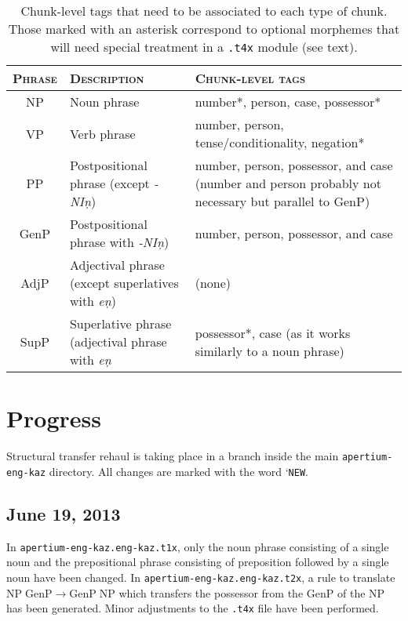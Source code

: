 \documentclass{article}
\begin{document}
\begin{table}
\begin{center}
\begin{tabular}{c|p{4cm}|p{5.6cm}}
\hline\hline
\textsc{Phrase} & \textsc{Description} & \textsc{Chunk-level tags} \\\hline
NP & Noun phrase & number*, person, case, possessor* \\
VP & Verb phrase & number, person, tense/conditionality, negation* \\ 
PP & Postpositional phrase (except \emph{-NI\c{n}}) & number, person, possessor, and case (number and person probably not necessary but parallel to GenP) \\
GenP & Postpositional phrase with \emph{-NI\c{n}}) & number, person, possessor, and case \\
AdjP & Adjectival phrase (except superlatives with \emph{e\c{n}}) & (none) \\
SupP & Superlative phrase (adjectival phrase with \emph{e\c{n}} & possessor*, case (as it works similarly to a noun phrase) \\\hline
\end{tabular}
\end{center}
\caption{Chunk-level tags that need to be associated to each type of chunk. Those marked with an asterisk correspond to optional morphemes that will need special treatment in a \texttt{.t4x} module (see text).}
\end{table}

\section{Progress}
Structural transfer rehaul is taking place in a branch inside the main
\texttt{apertium-eng-kaz} directory. All changes are marked with the word `\texttt{NEW}.

\subsection{June 19, 2013}

In \texttt{apertium-eng-kaz.eng-kaz.t1x}, only the noun phrase consisting of a single noun and the prepositional phrase consisting of preposition followed by a single noun have been changed. In \texttt{apertium-eng-kaz.eng-kaz.t2x}, a rule to translate \(\mathrm{NP}\;\mathrm{GenP}\to\mathrm{GenP}\;\mathrm{NP}\) which transfers the possessor from the \(\mathrm{GenP}\)
 of the \(\mathrm{NP}\) has been generated. Minor adjustments to the \texttt{.t4x} file have been performed.
\end{document}
